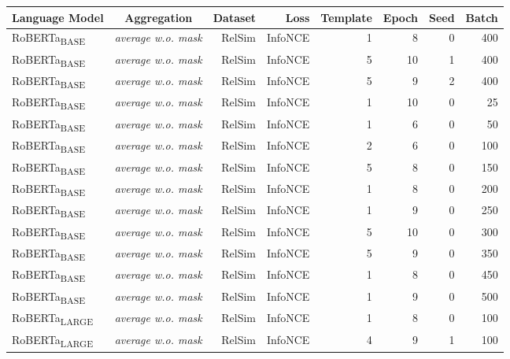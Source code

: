 \documentclass[3p]{elsarticle}
\begin{document}
{\begin{table}[ht]
\centering
\begin{tabular}{lcrrrrrr}
\toprule
Language Model              & Aggregation               & Dataset   & Loss      & Template & Epoch & Seed & Batch \\
\midrule
RoBERTa\textsubscript{BASE} & \emph{average w.o. mask}  & RelSim    & InfoNCE   & 1        & 8     & 0    & 400\\
RoBERTa\textsubscript{BASE} & \emph{average w.o. mask}  & RelSim    & InfoNCE   & 5        & 10    & 1    & 400\\
RoBERTa\textsubscript{BASE} & \emph{average w.o. mask}  & RelSim    & InfoNCE   & 5        & 9     & 2    & 400\\ \midrule
RoBERTa\textsubscript{BASE} & \emph{average w.o. mask}  & RelSim    & InfoNCE   & 1        & 10    & 0    & 25\\
RoBERTa\textsubscript{BASE} & \emph{average w.o. mask}  & RelSim    & InfoNCE   & 1        & 6     & 0    & 50\\
RoBERTa\textsubscript{BASE} & \emph{average w.o. mask}  & RelSim    & InfoNCE   & 2        & 6     & 0    & 100\\
RoBERTa\textsubscript{BASE} & \emph{average w.o. mask}  & RelSim    & InfoNCE   & 5        & 8     & 0    & 150\\
RoBERTa\textsubscript{BASE} & \emph{average w.o. mask}  & RelSim    & InfoNCE   & 1        & 8     & 0    & 200\\
RoBERTa\textsubscript{BASE} & \emph{average w.o. mask}  & RelSim    & InfoNCE   & 1        & 9     & 0    & 250\\
RoBERTa\textsubscript{BASE} & \emph{average w.o. mask}  & RelSim    & InfoNCE   & 5        & 10    & 0    & 300\\
RoBERTa\textsubscript{BASE} & \emph{average w.o. mask}  & RelSim    & InfoNCE   & 5        & 9     & 0    & 350\\ 
RoBERTa\textsubscript{BASE} & \emph{average w.o. mask}  & RelSim    & InfoNCE   & 1        & 8     & 0    & 450\\
RoBERTa\textsubscript{BASE} & \emph{average w.o. mask}  & RelSim    & InfoNCE   & 1        & 9     & 0    & 500\\
\midrule
RoBERTa\textsubscript{LARGE}& \emph{average w.o. mask}  & RelSim    & InfoNCE   & 1 & 8 & 0 & 100\\
RoBERTa\textsubscript{LARGE}& \emph{average w.o. mask}  & RelSim    & InfoNCE   & 4 & 9 & 1 & 100\\ 

\end{tabular}
\end{table}}
\end{document}
